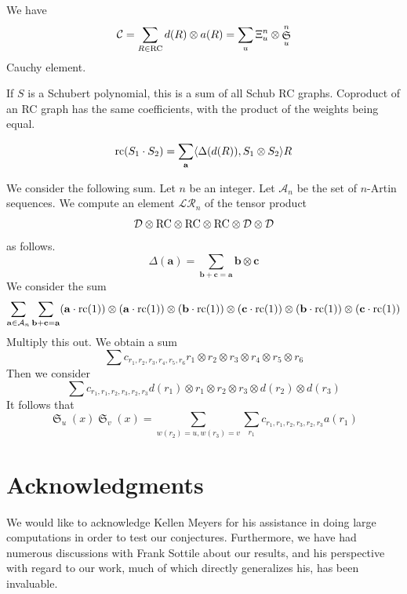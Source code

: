 \documentclass{elsarticle}
\theoremstyle{definition}
\theoremstyle{remark}
\numberwithin{equation}{subsection}
\DeclareMathOperator{\sch}{\mathfrak{S}}
\begin{document}
We have
$$\mathcal{C}=\sum_{R\in\RC} d(R)\otimes a(R) = \sum_u \dsch_u^n\otimes \sch_u^n$$
Cauchy element.

If $S$ is a Schubert polynomial, this is a sum of all Schub RC graphs. Coproduct of an RC graph has the same coefficients, with the product of the weights being equal.


$$\mathrm{rc}(S_1\cdot S_2) = \sum_{\mathbf{a}} \langle \Delta(d(R)), S_1\otimes S_2\rangle R$$

We consider the following sum. Let $n$ be an integer. Let $\mathcal{A}_n$ be the set of $n$-Artin sequences. We compute an element $\mathcal{LR}_n$ of the tensor product
$$\mathcal{D}\otimes \mathrm{RC} \otimes \mathrm{RC}\otimes \mathrm{RC}\otimes \mathcal{D}\otimes \mathcal{D}$$
as follows.%
$$\Delta(\mathbf{a})=\sum_{\mathbf{b}+\mathbf{c}=\mathbf{a}} \mathbf{b}\otimes \mathbf{c}$$
We consider the sum
$$\sum_{\mathbf{a}\in \mathcal{A}_n}\sum_{\mathbf{b}+\mathbf{c}=\mathbf{a}} (\mathbf{a} \cdot \mathrm{rc}(1))\otimes (\mathbf{a} \cdot \mathrm{rc}(1))\otimes (\mathbf{b} \cdot \mathrm{rc}(1))\otimes (\mathbf{c} \cdot \mathrm{rc}(1))\otimes (\mathbf{b} \cdot \mathrm{rc}(1))\otimes (\mathbf{c} \cdot \mathrm{rc}(1))$$
Multiply this out. We obtain a sum
$$\sum c_{r_1,r_2,r_3,r_4,r_5,r_6} r_1\otimes r_2\otimes r_3\otimes r_4\otimes r_5 \otimes r_6$$
Then we consider
$$\sum c_{r_1,r_1,r_2,r_3,r_2,r_3} d(r_1)\otimes r_1\otimes r_2\otimes r_3\otimes d(r_2) \otimes d(r_3)$$
It follows that
$$\sch_u(x)\sch_v(x) = \sum_{w(r_2)=u,w(r_3)=v}\sum_{r_1} c_{r_1,r_1,r_2,r_3,r_2,r_3}a(r_1)$$


\section*{Acknowledgments}


We would like to acknowledge Kellen Meyers for his assistance in doing large computations in order to test our conjectures. Furthermore, we have had numerous discussions with Frank Sottile about our results, and his perspective with regard to our work, much of which directly generalizes his, has been invaluable.




\end{document}
